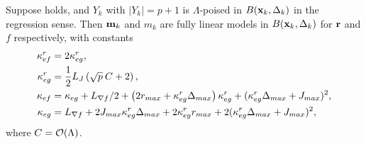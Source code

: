 \begin{lemma} \label{lem_fully_linear}
	Suppose  holds, and $Y_k$ with $|Y_k|=p+1$ is $\Lambda$-poised in $B(\mathbf{x}_k,\Delta_k)$ in the regression sense.
	Then $\mathbf{m}_k$ and $m_k$ are fully linear models in $B(\mathbf{x}_k,\Delta_k)$ for $\mathbf{r}$ and $f$ respectively, with constants
	\begin{align}
		\kappa_{ef}^r &= 2\kappa_{eg}^r, \\
		\kappa_{eg}^r &= \frac{1}{2}L_J\left(\sqrt{p}\:C+2\right), \\
		\kappa_{ef} &= \kappa_{eg} + L_{\nabla f}/2 + \left(2r_{max}+\kappa_{eg}^r\Delta_{max}\right)\kappa_{eg}^r + (\kappa_{eg}^r\Delta_{max} + J_{max})^2, \\
		\kappa_{eg} &= L_{\nabla f} + 2 J_{max}\kappa_{eg}^r \Delta_{max} + 2\kappa_{eg}^r r_{max} + 2(\kappa_{eg}^r\Delta_{max}+J_{max})^2,
	\end{align}
	where $C=\mathcal{O}(\Lambda)$.
\end{lemma}
